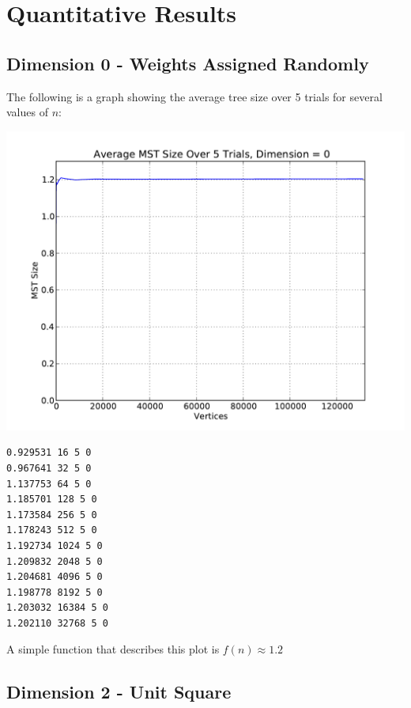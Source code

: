 \documentclass[solution, letterpaper]{cs121}
\begin{document}

\section*{Quantitative Results}
\subsection*{Dimension 0 - Weights Assigned Randomly}

The following is a graph showing the average tree size over 5 trials for several values of $n$: 
\begin{center}
\includegraphics[scale=0.6]{graphs/kruskals-dimension-0.pdf}
\begin{verbatim}
0.929531 16 5 0
0.967641 32 5 0
1.137753 64 5 0
1.185701 128 5 0
1.173584 256 5 0
1.178243 512 5 0
1.192734 1024 5 0
1.209832 2048 5 0
1.204681 4096 5 0
1.198778 8192 5 0
1.203032 16384 5 0
1.202110 32768 5 0
\end{verbatim}
\end{center}

A simple function that describes this plot is $f(n) \approx 1.2$

\pagebreak
\subsection*{Dimension 2 - Unit Square}
\end{document}

